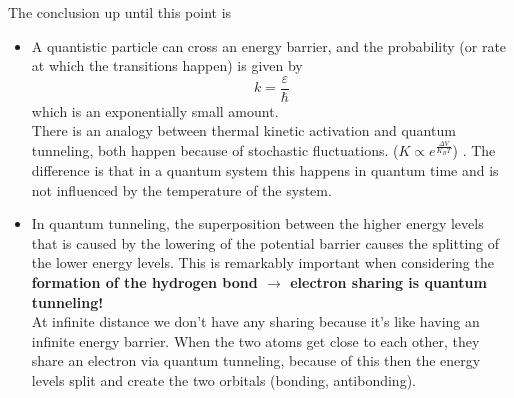 The conclusion up until this point is
\begin{itemize}
	\item A quantistic particle can cross an energy barrier, and the probability (or 		rate at which the transitions happen) is given by
	\[
	k=\frac{\varepsilon}{\hbar}
	\]
	which is an exponentially small amount.\\
	There is an analogy between thermal kinetic activation and quantum tunneling, both 	happen because of stochastic fluctuations. ($K\propto e^{\frac{\Delta V}{K_B T}}$)		. The difference is that in a quantum system this happens in quantum time and is 		not influenced by the temperature of the system.\\
	\item In quantum tunneling, the superposition between the higher energy levels 			that is caused by the lowering of the potential barrier causes the splitting of 		the lower energy levels. This is remarkably important when considering the 				\textbf{formation of the hydrogen bond $\rightarrow$ electron sharing is quantum 		tunneling!}\\
	At infinite distance we don't have any sharing because it's like having an 				infinite energy barrier. When the two atoms get close to each other, they share an 	electron via quantum tunneling, because of this then the energy levels split and 		create the two orbitals (bonding, antibonding).\\
\end{itemize}

